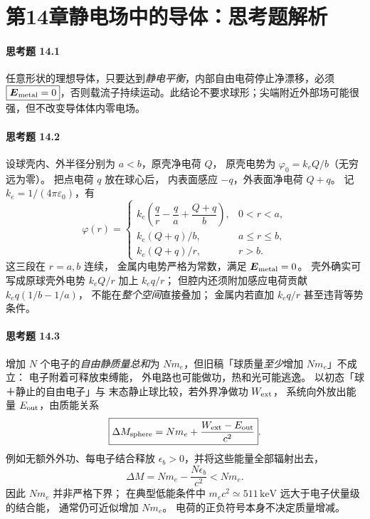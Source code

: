 \section*{第14章\quad 静电场中的导体：思考题解析}
\paragraph{思考题 14.1}
任意形状的理想导体，只要达到\emph{静电平衡}，内部自由电荷停止净漂移，必须 \(\boxed{\boldsymbol E_{\rm metal}=0}\)，否则载流子持续运动。此结论不要求球形；尖端附近外部场可能很强，但不改变导体体内零电场。

\paragraph{思考题 14.2}
设球壳内、外半径分别为 \(a<b\)，原壳净电荷 \(Q\)，
原壳电势为 \(\varphi_0=k_eQ/b\)（无穷远为零）。
把点电荷 \(q\) 放在球心后，
内表面感应 \(-q\)，外表面净电荷 \(Q+q\)。
记 \(k_e=1/(4\pi\varepsilon_0)\)，有
\[
 \boxed{\varphi(r)=
 \begin{cases}
 k_e\left(\dfrac qr-\dfrac qa+\dfrac{Q+q}b\right),
       &0<r<a,\\
 k_e(Q+q)/b,&a\le r\le b,\\
 k_e(Q+q)/r,&r>b.
 \end{cases}}
\]
这三段在 \(r=a,b\) 连续，
金属内电势严格为常数，满足
\(\boldsymbol E_{\rm metal}=0\)。
壳外确实可写成原球壳外电势
\(k_eQ/r\) 加上 \(k_eq/r\)；
但腔内还须附加感应电荷贡献
\(k_eq(1/b-1/a)\)，
不能在\emph{整个空间}直接叠加；
金属内若直加 \(k_eq/r\) 甚至违背等势条件。

\paragraph{思考题 14.3}
增加 \(N\) 个电子的\emph{自由静质量总和}为
\(Nm_e\)，但旧稿「球质量\emph{至少}增加
\(Nm_e\)」不成立：
电子附着可释放束缚能，
外电路也可能做功，热和光可能逃逸。
以初态「球＋静止的自由电子」与
末态静止球比较，若外界净做功 \(W_{\rm ext}\)，
系统向外放出能量 \(E_{\rm out}\)，由质能关系
\[
 \boxed{\Delta M_{\rm sphere}
 =Nm_e+\frac{W_{\rm ext}-E_{\rm out}}{c^2}}.
\]
例如无额外外功、每电子结合释放
\(\epsilon_b>0\)，并将这些能量全部辐射出去，
\[
 \Delta M=Nm_e-\frac{N\epsilon_b}{c^2}
 <Nm_e.
\]
因此 \(Nm_e\) 并非严格下界；
在典型低能条件中
\(m_ec^2\simeq511\,\mathrm{keV}\)
远大于电子伏量级的结合能，
通常仍可近似增加 \(Nm_e\)。
电荷的正负符号本身不决定质量增减。

